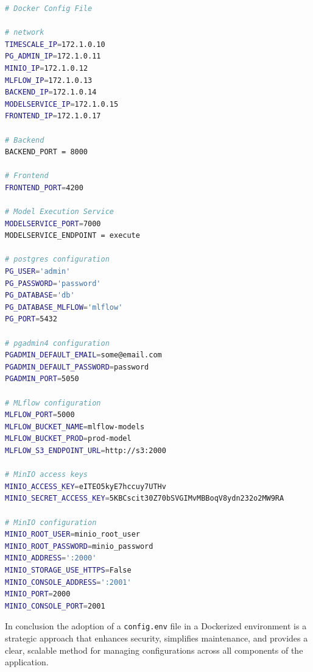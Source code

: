 \begin{lstlisting}[language=bash, caption=Docker Configuration File, label={lst:docker_config_env}]
# Docker Config File 

# network
TIMESCALE_IP=172.1.0.10
PG_ADMIN_IP=172.1.0.11
MINIO_IP=172.1.0.12
MLFLOW_IP=172.1.0.13
BACKEND_IP=172.1.0.14
MODELSERVICE_IP=172.1.0.15
FRONTEND_IP=172.1.0.17

# Backend
BACKEND_PORT = 8000

# Frontend
FRONTEND_PORT=4200

# Model Execution Service 
MODELSERVICE_PORT=7000
MODELSERVICE_ENDPOINT = execute

# postgres configuration
PG_USER='admin'
PG_PASSWORD='password'
PG_DATABASE='db'
PG_DATABASE_MLFLOW='mlflow'
PG_PORT=5432

# pgadmin4 configuration
PGADMIN_DEFAULT_EMAIL=some@email.com
PGADMIN_DEFAULT_PASSWORD=password
PGADMIN_PORT=5050

# MLflow configuration
MLFLOW_PORT=5000
MLFLOW_BUCKET_NAME=mlflow-models
MLFLOW_BUCKET_PROD=prod-model
MLFLOW_S3_ENDPOINT_URL=http://s3:2000

# MinIO access keys 
MINIO_ACCESS_KEY=eITEO5kyE7hccuy7UTHv
MINIO_SECRET_ACCESS_KEY=5KBCscit30Z70bSVGIMvMBBoqV8ydn232o2MW9RA

# MinIO configuration
MINIO_ROOT_USER=minio_root_user
MINIO_ROOT_PASSWORD=minio_password
MINIO_ADDRESS=':2000'
MINIO_STORAGE_USE_HTTPS=False
MINIO_CONSOLE_ADDRESS=':2001'
MINIO_PORT=2000
MINIO_CONSOLE_PORT=2001


\end{lstlisting}

In conclusion the adoption of a \texttt{config.env} file in a Dockerized environment is a strategic approach that enhances security, simplifies maintenance, and provides a clear, scalable method for managing configurations across all components of the application. 